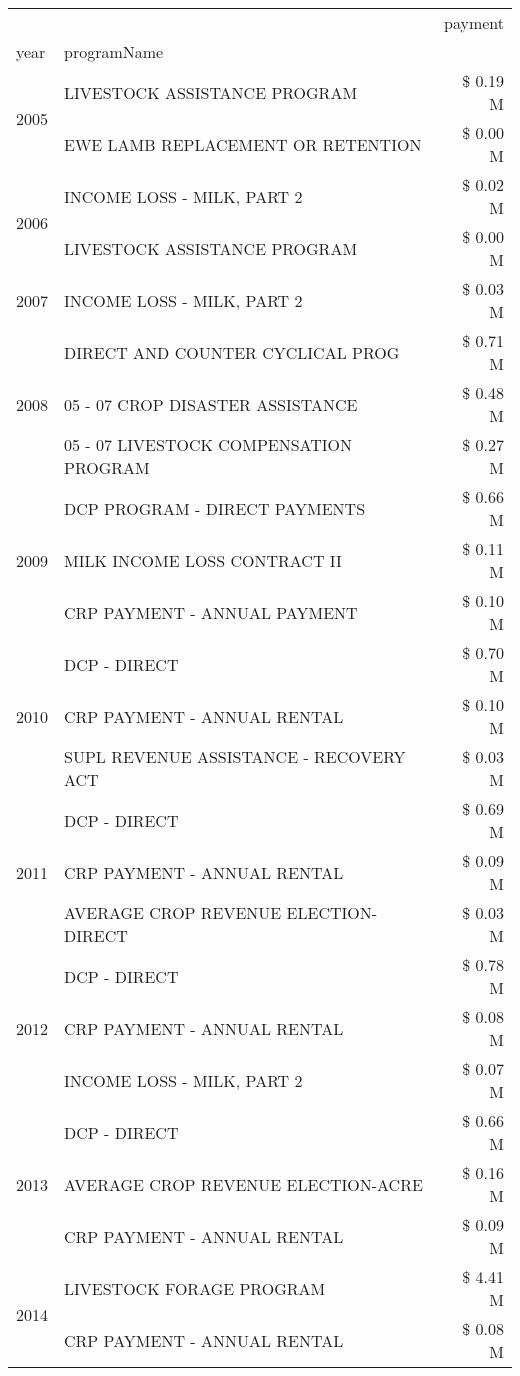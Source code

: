 \begin{tabular}{llr}
\toprule
 &  & payment \\
year & programName &  \\
\midrule
\multirow[t]{2}{*}{2005} & LIVESTOCK ASSISTANCE PROGRAM & \$ 0.19 M \\
 & EWE LAMB REPLACEMENT OR RETENTION & \$ 0.00 M \\
\cline{1-3}
\multirow[t]{2}{*}{2006} & INCOME LOSS - MILK, PART 2 & \$ 0.02 M \\
 & LIVESTOCK ASSISTANCE PROGRAM & \$ 0.00 M \\
\cline{1-3}
2007 & INCOME LOSS - MILK, PART 2 & \$ 0.03 M \\
\cline{1-3}
\multirow[t]{3}{*}{2008} & DIRECT AND COUNTER CYCLICAL PROG & \$ 0.71 M \\
 & 05 - 07 CROP DISASTER ASSISTANCE & \$ 0.48 M \\
 & 05 - 07 LIVESTOCK COMPENSATION PROGRAM & \$ 0.27 M \\
\cline{1-3}
\multirow[t]{3}{*}{2009} & DCP PROGRAM - DIRECT PAYMENTS & \$ 0.66 M \\
 & MILK INCOME LOSS CONTRACT II & \$ 0.11 M \\
 & CRP PAYMENT - ANNUAL PAYMENT & \$ 0.10 M \\
\cline{1-3}
\multirow[t]{3}{*}{2010} & DCP - DIRECT & \$ 0.70 M \\
 & CRP PAYMENT - ANNUAL RENTAL & \$ 0.10 M \\
 & SUPL REVENUE ASSISTANCE - RECOVERY ACT & \$ 0.03 M \\
\cline{1-3}
\multirow[t]{3}{*}{2011} & DCP - DIRECT & \$ 0.69 M \\
 & CRP PAYMENT - ANNUAL RENTAL & \$ 0.09 M \\
 & AVERAGE CROP REVENUE ELECTION-DIRECT & \$ 0.03 M \\
\cline{1-3}
\multirow[t]{3}{*}{2012} & DCP - DIRECT & \$ 0.78 M \\
 & CRP PAYMENT - ANNUAL RENTAL & \$ 0.08 M \\
 & INCOME LOSS - MILK, PART 2 & \$ 0.07 M \\
\cline{1-3}
\multirow[t]{3}{*}{2013} & DCP - DIRECT & \$ 0.66 M \\
 & AVERAGE CROP REVENUE ELECTION-ACRE & \$ 0.16 M \\
 & CRP PAYMENT - ANNUAL RENTAL & \$ 0.09 M \\
\cline{1-3}
\multirow[t]{3}{*}{2014} & LIVESTOCK FORAGE PROGRAM & \$ 4.41 M \\
 & CRP PAYMENT - ANNUAL RENTAL & \$ 0.08 M \\

\end{tabular}
